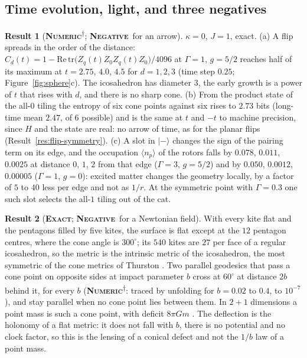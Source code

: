 \documentclass[11pt]{article}
\newcommand{\exact}{\textbf{\textsc{Exact}}}
\newcommand{\numeric}{\textbf{\textsc{Numeric}}}
\newcommand{\negres}{\textbf{\textsc{Negative}}}
\newcommand{\snap}{\textsuperscript{$\dagger$}}      %
\theoremstyle{definition}
\newtheorem{result}{Result}
\begin{document}
\subsection{Time evolution, light, and three negatives}
\begin{result}[\numeric\snap; \negres\ for an arrow]\label{res:sphere-time}
$\kappa=0$, $J=1$, exact. (a) A flip spreads in the order of the distance: $C_d(t)=1-\mathrm{Re}\,\mathrm{tr}\bigl(Z_q(t)Z_0Z_q(t)Z_0\bigr)/4096$ at $\Gamma=1$, $g=5/2$ reaches half of its maximum at $t=2.75$, $4.0$, $4.5$ for $d=1,2,3$ (time step $0.25$; Figure~\ref{fig:sphere}c). The icosahedron has diameter $3$, the early growth is a power of $t$ that rises with $d$, and there is no sharp cone. (b) From the product state of the all-$0$ tiling the entropy of six cone points against six rises to $2.73$ bits (long-time mean $2.47$, of $6$ possible) and is the same at $t$ and $-t$ to machine precision, since $H$ and the state are real: no arrow of time, as for the planar flips (Result~\ref{res:flip-symmetry}). (c) A slot in $|-\rangle$ changes the sign of the pairing term on its edge, and the occupation $\langle n_p\rangle$ of the rotors falls by $0.078$, $0.011$, $0.0025$ at distance $0$, $1$, $2$ from that edge ($\Gamma=3$, $g=5/2$) and by $0.050$, $0.0012$, $0.00005$ ($\Gamma=1$, $g=0$): excited matter changes the geometry locally, by a factor of $5$ to $40$ less per edge and not as $1/r$. At the symmetric point with $\Gamma=0.3$ one such slot selects the all-$1$ tiling out of the cat.
\end{result}
\begin{result}[\exact; \negres\ for a Newtonian field]\label{res:sphere-light}
With every kite flat and the pentagons filled by five kites, the surface is flat except at the $12$ pentagon centres, where the cone angle is $300^\circ$; its $540$ kites are $27$ per face of a regular icosahedron, so the metric is the intrinsic metric of the icosahedron, the most symmetric of the cone metrics of Thurston \cite{thurston1998}. Two parallel geodesics that pass a cone point on opposite sides at impact parameter $b$ cross at $60^\circ$ at distance $2b$ behind it, for every $b$ (\numeric\snap: traced by unfolding for $b=0.02$ to $0.4$, to $10^{-7}$), and stay parallel when no cone point lies between them. In $2+1$ dimensions a point mass is such a cone point, with deficit $8\pi Gm$ \cite{deser1984}. The deflection is the holonomy of a flat metric: it does not fall with $b$, there is no potential and no clock factor, so this is the lensing of a conical defect and not the $1/b$ law of a point mass.
\end{result}
\end{document}
